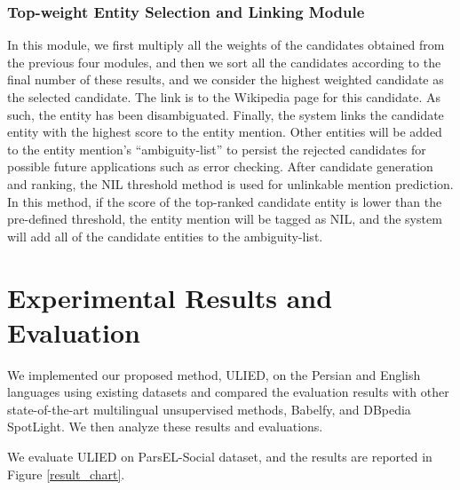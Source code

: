 \documentclass{article}
\begin{document}
\subsubsection{Top-weight Entity Selection and Linking Module}
In this module, we first multiply all the weights of the candidates obtained from the previous four modules, and then we sort all the candidates according to the final number of these results, and we consider the highest weighted candidate as the selected candidate. The link is to the Wikipedia page for this candidate. As such, the entity has been disambiguated. Finally, the system links the candidate entity with the highest score to the entity mention. Other entities will be added to the entity mention's ``ambiguity-list'' to persist the rejected candidates for possible future applications such as error checking. 
After candidate generation and ranking, the NIL threshold method is used for unlinkable mention prediction. In this method, if the score of the top-ranked candidate entity is lower than the pre-defined threshold, the entity mention will be tagged as NIL, and the system will add all of the candidate entities to the ambiguity-list.

\section{Experimental Results and Evaluation}
\label{sec:results-sec}
We implemented our proposed method, ULIED, on the Persian and English languages using existing datasets and compared the evaluation results with other state-of-the-art multilingual unsupervised methods, Babelfy, and DBpedia SpotLight. We then analyze these results and evaluations.

We evaluate ULIED on ParsEL-Social dataset, and the results are reported in Figure \ref{result_chart}. 
\end{document}
